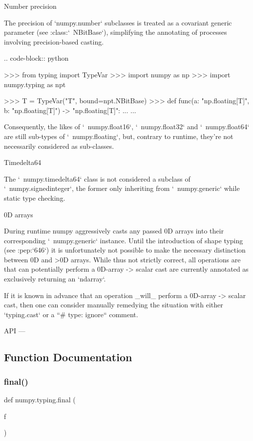 \begin{DoxyVerb}
Number precision
~~~~~~~~~~~~~~~~

The precision of `numpy.number` subclasses is treated as a covariant generic
parameter (see :class:`~NBitBase`), simplifying the annotating of processes
involving precision-based casting.

.. code-block:: python

    >>> from typing import TypeVar
    >>> import numpy as np
    >>> import numpy.typing as npt

    >>> T = TypeVar("T", bound=npt.NBitBase)
    >>> def func(a: "np.floating[T]", b: "np.floating[T]") -> "np.floating[T]":
    ...     ...

Consequently, the likes of `~numpy.float16`, `~numpy.float32` and
`~numpy.float64` are still sub-types of `~numpy.floating`, but, contrary to
runtime, they're not necessarily considered as sub-classes.

Timedelta64
~~~~~~~~~~~

The `~numpy.timedelta64` class is not considered a subclass of `~numpy.signedinteger`,
the former only inheriting from `~numpy.generic` while static type checking.

0D arrays
~~~~~~~~~

During runtime numpy aggressively casts any passed 0D arrays into their
corresponding `~numpy.generic` instance. Until the introduction of shape
typing (see :pep:`646`) it is unfortunately not possible to make the
necessary distinction between 0D and >0D arrays. While thus not strictly
correct, all operations are that can potentially perform a 0D-array -> scalar
cast are currently annotated as exclusively returning an `ndarray`.

If it is known in advance that an operation _will_ perform a
0D-array -> scalar cast, then one can consider manually remedying the
situation with either `typing.cast` or a ``# type: ignore`` comment.

API
---\end{DoxyVerb}
 

\subsection{Function Documentation}
\mbox{\label{namespacenumpy_1_1typing_ae5318a3c44e5bcc959a32b1436f7d65a}} 
\subsubsection{\texorpdfstring{final()}{final()}}
{\footnotesize\ttfamily def numpy.\+typing.\+final (\begin{DoxyParamCaption}\item[{}]{f }\end{DoxyParamCaption})}



